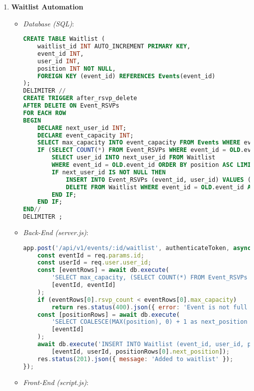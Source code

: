 \documentclass[12pt]{article}
\begin{document}
\begin{enumerate}
    \item \textbf{Waitlist Automation}
        \begin{itemize}
            \item \textit{Database (SQL)}:
\begin{lstlisting}[language=SQL, caption={Waitlist and Trigger}]
CREATE TABLE Waitlist (
    waitlist_id INT AUTO_INCREMENT PRIMARY KEY,
    event_id INT,
    user_id INT,
    position INT NOT NULL,
    FOREIGN KEY (event_id) REFERENCES Events(event_id)
);
DELIMITER //
CREATE TRIGGER after_rsvp_delete
AFTER DELETE ON Event_RSVPs
FOR EACH ROW
BEGIN
    DECLARE next_user_id INT;
    DECLARE event_capacity INT;
    SELECT max_capacity INTO event_capacity FROM Events WHERE event_id = OLD.event_id;
    IF (SELECT COUNT(*) FROM Event_RSVPs WHERE event_id = OLD.event_id) < event_capacity THEN
        SELECT user_id INTO next_user_id FROM Waitlist 
        WHERE event_id = OLD.event_id ORDER BY position ASC LIMIT 1;
        IF next_user_id IS NOT NULL THEN
            INSERT INTO Event_RSVPs (event_id, user_id) VALUES (OLD.event_id, next_user_id);
            DELETE FROM Waitlist WHERE event_id = OLD.event_id AND user_id = next_user_id;
        END IF;
    END IF;
END//
DELIMITER ;
\end{lstlisting}
            \item \textit{Back-End (server.js)}:
\begin{lstlisting}[language=JavaScript, caption={Waitlist Addition}]
app.post('/api/v1/events/:id/waitlist', authenticateToken, async (req, res) => {
    const eventId = req.params.id;
    const userId = req.user.user_id;
    const [eventRows] = await db.execute(
        'SELECT max_capacity, (SELECT COUNT(*) FROM Event_RSVPs WHERE event_id = ?) as rsvp_count FROM Events WHERE event_id = ?', 
        [eventId, eventId]
    );
    if (eventRows[0].rsvp_count < eventRows[0].max_capacity) 
        return res.status(400).json({ error: 'Event is not full yet' });
    const [positionRows] = await db.execute(
        'SELECT COALESCE(MAX(position), 0) + 1 as next_position FROM Waitlist WHERE event_id = ?', 
        [eventId]
    );
    await db.execute('INSERT INTO Waitlist (event_id, user_id, position) VALUES (?, ?, ?)', 
        [eventId, userId, positionRows[0].next_position]);
    res.status(201).json({ message: 'Added to waitlist' });
});
\end{lstlisting}
            \item \textit{Front-End (script.js)}:
\begin{lstlisting}[language=JavaScript, caption={Waitlist Action}]

\end{lstlisting}
\end{itemize}
\end{enumerate}
\end{document}
